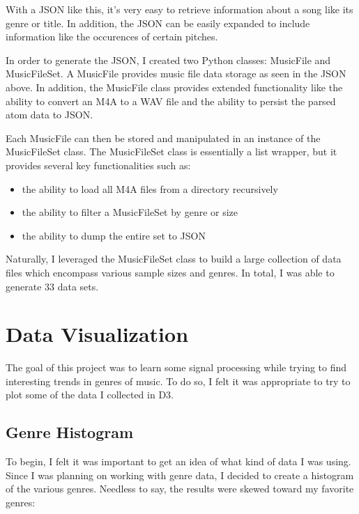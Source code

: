 \documentclass[journal]{vgtc}                %
\begin{document}
With a JSON like this, it's very easy to retrieve information about a song like
its genre or title. In addition, the JSON can be easily expanded to include
information like the occurences of certain pitches.

In order to generate the JSON, I created two Python classes: MusicFile and
MusicFileSet. A MusicFile provides music file data storage as seen in the JSON
above. In addition, the MusicFile class provides extended functionality like
the ability to convert an M4A to a WAV file and the ability to persist the
parsed atom data to JSON.

Each MusicFile can then be stored and manipulated in an instance of the
MusicFileSet class. The MusicFileSet class is essentially a list wrapper, but
it provides several key functionalities such as:

\begin{itemize}
  \item the ability to load all M4A files from a directory recursively
  \item the ability to filter a MusicFileSet by genre or size
  \item the ability to dump the entire set to JSON
\end{itemize}

Naturally, I leveraged the MusicFileSet class to build a large collection of
data files which encompass various sample sizes and genres. In total, I was
able to generate 33 data sets.

\section{Data Visualization}

The goal of this project was to learn some signal processing while trying to
find interesting trends in genres of music. To do so, I felt it was appropriate
to try to plot some of the data I collected in D3.

\subsection{Genre Histogram}

To begin, I felt it was important to get an idea of what kind of data I was
using. Since I was planning on working with genre data, I decided to create
a histogram of the various genres. Needless to say, the results were skewed
toward my favorite genres:
\end{document}
